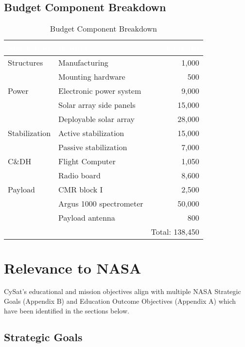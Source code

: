 \documentclass[nocover]            %
{CSLI}                       %
\begin{document}
\subsection{Budget Component Breakdown}
\begin{table}[H]
\centering
\caption{Budget Component Breakdown}
\begin{tabular}{| l | p{5cm} | r |}
\arrayrulecolor{white}
\hline
\rowcolor{gray!80}
\textcolor{white}{\textbf{Subsystem}} & \textcolor{white}{\textbf{Item(s)}} &  \textcolor{white}{\textbf{Cost (\$)}} \\ \hline
\rowcolor{gray!10}
Structures & Manufacturing&1,000 \\
\rowcolor{gray!10}
 &Mounting hardware &500 \\ \hline
\rowcolor{gray!5}
Power & Electronic power system & 9,000\\
\rowcolor{gray!5}
& Solar array side panels &15,000 \\
\rowcolor{gray!5}
& Deployable solar array & 28,000\\ \hline
\rowcolor{gray!10}
Stabilization & Active stabilization&15,000 \\ 
\rowcolor{gray!10}
&Passive stabilization &7,000 \\ \hline
\rowcolor{gray!5}
C\&DH& Flight Computer &1,050\\
\rowcolor{gray!5}
& Radio board& 8,600\\ \hline
\rowcolor{gray!10}
Payload & CMR block I &2,500 \\ 
\rowcolor{gray!10}
& Argus 1000 spectrometer &50,000 \\
\rowcolor{gray!10}
& Payload antenna & 800\\\hline
\rowcolor{gray!5}
 &  & Total: 138,450\\ \hline
\end{tabular}
\end{table}

\section{Relevance to NASA}
CySat's educational and mission objectives align with multiple NASA Strategic Goals (Appendix B) and Education Outcome Objectives (Appendix A) which have been identified in the sections below.
\subsection{Strategic Goals}
\end{document}
